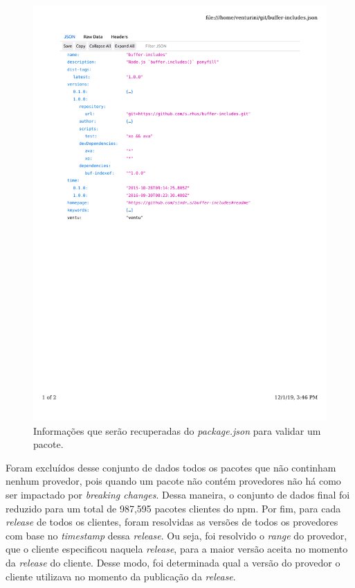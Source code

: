 \begin{figure}
    \centering
    \includegraphics[scale=0.65]{figuras/package_json.pdf}
    \caption{Informações que serão recuperadas do \textit{package.json} para validar um pacote.}
    \label{fig:package_json}
\end{figure}{}

Foram excluídos desse conjunto de dados todos os pacotes que não continham nenhum provedor, pois quando um pacote não contém provedores não há como ser impactado por \textit{breaking changes}. Dessa maneira, o conjunto de dados final foi reduzido para um total de 987,595 pacotes clientes do \textsf{npm}. Por fim, para cada \textit{release} de todos os clientes, foram resolvidas as versões de todos os provedores com base no \textit{timestamp} dessa \textit{release}. Ou seja, foi resolvido o \textit{range} do provedor, que o cliente especificou naquela \textit{release}, para a maior versão aceita no momento da \textit{release} do cliente. Desse modo, foi determinada qual a versão do provedor o cliente utilizava no momento da publicação da \textit{release}.

